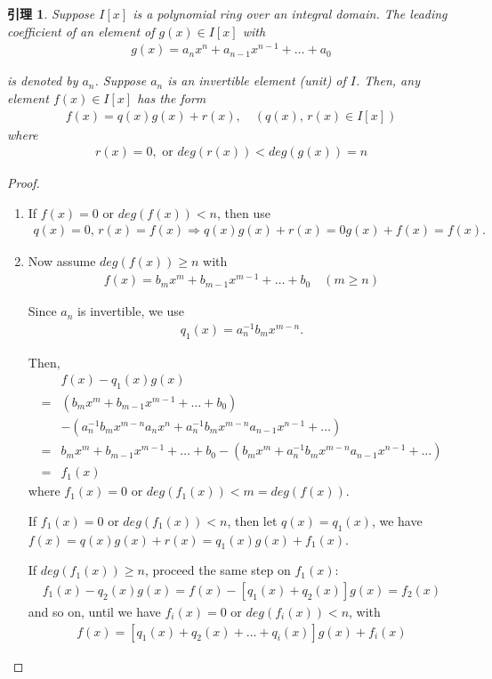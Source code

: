 \documentclass[utf8]{ctexbook}
\newtheorem{lemma}{引理}[section]
\begin{document}
\begin{lemma}\label{lemma_ID_polynomial_ring}
Suppose $I[x]$ is a polynomial ring over an integral domain. The leading coefficient of an element of $g(x) \in I[x]$ with
\begin{align*}
g(x)= a_n x^n + a_{n-1} x^{n-1} + \ldots + a_0
\end{align*}

is denoted by $a_n$. Suppose $a_n$ is an invertible element (unit) of $I$. Then, any element $f(x) \in I[x]$ has the form
\begin{align*}
f(x) = q(x) g(x) + r(x), \quad (q(x), \, r(x) \in I[x]) 
\end{align*}
where 
\begin{align*}
r(x) = 0, \mbox{ or } deg(r(x)) < deg(g(x)) = n
\end{align*}
\end{lemma}

\begin{proof}
\begin{enumerate}
\item{If $f(x)=0$ or $deg(f(x)) < n$, then use
\begin{align*}
q(x) = 0, \, r(x) = f(x) \Longrightarrow q(x) g(x) + r(x) = 0 g(x) + f(x) = f(x) .
\end{align*}
}
\item{Now assume $deg(f(x)) \geq n $ with
\begin{align*}
f(x) = b_m x^m + b_{m-1} x^{m-1} + \ldots + b_0  \quad (m \geq n)
\end{align*}

Since $a_n$ is invertible, we use
\begin{align*}
q_1 (x) = a_n ^{-1} b_m x^{m-n} .
\end{align*}

Then,
\begin{align*}
& f(x) - q_1(x) g(x) \\
=&  (b_m x^m + b_{m-1} x^{m-1} + \ldots + b_0) \\
& - (a_n ^{-1} b_m x^{m-n} a_n x^{n} + a_n ^{-1} b_m x^{m-n} a_{n-1} x^{n-1} + \ldots  ) \\
=& b_m x^m + b_{m-1} x^{m-1} + \ldots + b_0 - (b_m x^{m} + a_n ^{-1} b_m x^{m-n} a_{n-1} x^{n-1} + \ldots  ) \\
=& f_1 (x)
\end{align*}
where $f_1 (x) = 0$ or $deg(f_1(x)) < m = deg(f(x)) $. 

If $f_1 (x) = 0$ or $deg(f_1(x)) < n$, then let $q(x) = q_1 (x)$, we have $f(x) = q(x) g(x) + r(x) = q_1(x) g(x) + f_1 (x) $.

If $deg(f_1(x)) \geq n$, proceed the same step on $f_1 (x)$:
\begin{align*}
f_1 (x) - q_2 (x) g(x) = f(x) - [q_1 (x) + q_2 (x)] g(x) = f_2 (x)
\end{align*}
and so on, until we have $f_i(x) = 0$ or $deg(f_i (x)) < n$, with 
\begin{align*}
f(x) = [q_1 (x) + q_2(x) + \ldots + q_i (x) ] g(x) + f_i (x)
\end{align*}
}
\end{enumerate}
\end{proof}
\end{document}
